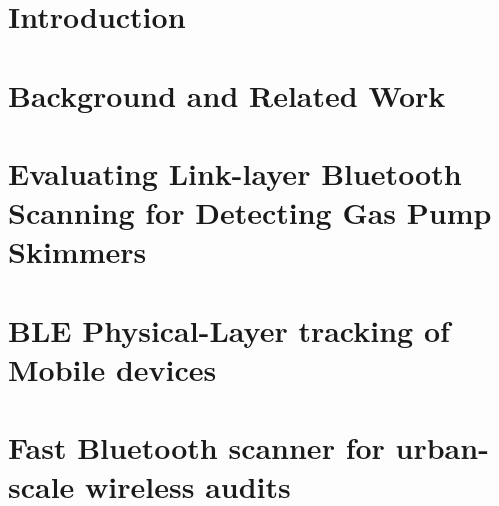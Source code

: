 \documentclass[12pt]{ucsddissertation}
\begin{document}
\frontmatter
\maketitle
\makecopyright
\makesignature



\tableofcontents
\listoffigures
\listoftables









\mainmatter

\chapter{Introduction}


\chapter{Background and Related Work}


\chapter{Evaluating Link-layer Bluetooth Scanning for Detecting Gas Pump Skimmers}


\chapter{BLE Physical-Layer tracking of Mobile devices}


\chapter{Fast Bluetooth scanner for urban-scale wireless audits}

\appendix

\backmatter

\end{document}
